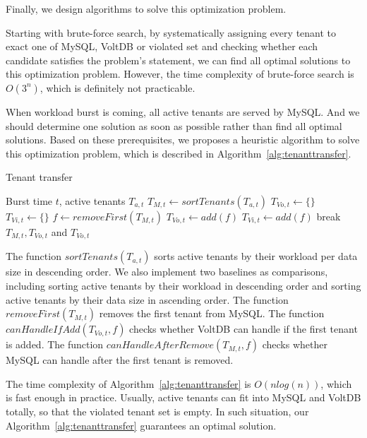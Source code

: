 \documentclass{article}
\begin{document}
Finally, we design algorithms to solve this optimization problem.

Starting with brute-force search, by systematically assigning every tenant to exact one of MySQL, VoltDB or violated set and checking whether each candidate satisfies the problem's statement, we can find all optimal solutions to this optimization problem. However, the time complexity of brute-force search is $O(3^n)$, which is definitely not practicable.

When workload burst is coming, all active tenants are served by MySQL. And we should determine one solution as soon as possible rather than find all optimal solutions. Based on these prerequisites, we proposes a heuristic algorithm to solve this optimization problem, which is described in Algorithm~\ref{alg:tenanttransfer}.
\begin{algorithm}[ht]
\caption{Tenant transfer}
\label{alg:tenanttransfer}
    \begin{algorithmic}[1]
    \Require Burst time $t$, active tenants $T_{a, t}$
    \State $T_{M, t} \gets sortTenants(T_{a, t})$
    \State $T_{Vo, t} \gets \{\}$
    \State $T_{Vi, t} \gets \{\}$
    \State $f \gets removeFirst(T_{M, t})$
        \State $T_{Vo, t} \gets add(f)$
    \Else
        \State $T_{Vi, t} \gets add(f)$
    \EndIf
        \State break
    \EndIf
    \EndWhile
    \Ensure $T_{M, t}, T_{Vo, t}$ and $T_{Vo, t}$
    \end{algorithmic}
\end{algorithm}

The function $sortTenants(T_{a, t})$ sorts active tenants by their workload per data size in descending order. We also implement two baselines as comparisons, including sorting active tenants by their workload in descending order and sorting active tenants by their data size in ascending order. The function $removeFirst(T_{M, t})$ removes the first tenant from MySQL. The function $canHandleIfAdd(T_{Vo, t}, f)$ checks whether VoltDB can handle if the first tenant is added. The function $canHandleAfterRemove(T_{M, t}, f)$ checks whether MySQL can handle after the first tenant is removed.

The time complexity of Algorithm~\ref{alg:tenanttransfer} is $O(nlog(n))$, which is fast enough in practice. Usually, active tenants can fit into MySQL and VoltDB totally, so that the violated tenant set is empty. In such situation, our Algorithm~\ref{alg:tenanttransfer} guarantees an optimal solution.
\end{document}
